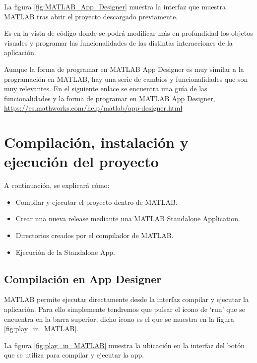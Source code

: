 
La figura \ref{fig:MATLAB_App_Designer} muestra la interfaz que muestra MATLAB tras abrir el proyecto descargado previamente.

Es en la vista de código donde se podrá modificar más en profundidad los objetos visuales y programar las funcionalidades de las distintas interacciones de la aplicación.

Aunque la forma de programar en MATLAB App Designer es muy similar a la programación en MATLAB, hay una serie de cambios y funcionalidades que son muy relevantes. En el siguiente enlace se encuentra una guía de las funcionalidades y la forma de programar en MATLAB App Designer, \url{https://es.mathworks.com/help/matlab/app-designer.html}

\section{Compilación, instalación y ejecución del proyecto}\label{compilación-instalación-ejecución}

A continuación, se explicará cómo:

\begin{itemize}
    \item Compilar y ejecutar el proyecto dentro de MATLAB.
    \item Crear una nueva release mediante una MATLAB Standalone Application.
    \item Directorios creados por el compilador de MATLAB.
    \item Ejecución de la Standalone App.
\end{itemize}

\subsection{Compilación en App Designer}\label{compilación-en-app-designer}

MATLAB permite ejecutar directamente desde la interfaz compilar y ejecutar la aplicación. Para ello simplemente tendremos que pulsar el icono de `run' que se encuentra en la barra superior, dicho icono es el que se muestra en la figura \ref{fig:play_in_MATLAB}.


La figura \ref{fig:play_in_MATLAB} muestra la ubicación en la interfaz del botón que se utiliza para compilar y ejecutar la app.

